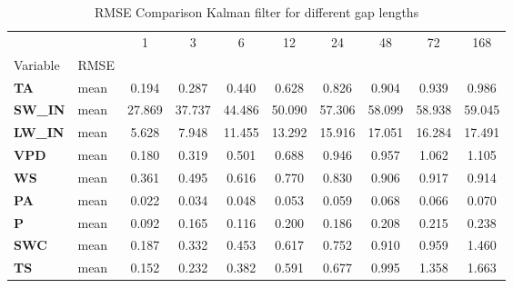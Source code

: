 \begin{table}
\centering
\caption{RMSE Comparison Kalman filter for different gap lengths}
\label{gap_len}
\begin{tabular}{p{2.1cm}l|cccccccc}
\toprule
 &  & 1 & 3 & 6 & 12 & 24 & 48 & 72 & 168 \\
Variable & RMSE &  &  &  &  &  &  &  &  \\
\midrule
\parbox{2.1cm}{\textbf{TA}} & mean & 0.194 & 0.287 & 0.440 & 0.628 & 0.826 & 0.904 & 0.939 & 0.986 \\
\parbox{2.1cm}{\textbf{SW\_IN}} & mean & 27.869 & 37.737 & 44.486 & 50.090 & 57.306 & 58.099 & 58.938 & 59.045 \\
\parbox{2.1cm}{\textbf{LW\_IN}} & mean & 5.628 & 7.948 & 11.455 & 13.292 & 15.916 & 17.051 & 16.284 & 17.491 \\
\parbox{2.1cm}{\textbf{VPD}} & mean & 0.180 & 0.319 & 0.501 & 0.688 & 0.946 & 0.957 & 1.062 & 1.105 \\
\parbox{2.1cm}{\textbf{WS}} & mean & 0.361 & 0.495 & 0.616 & 0.770 & 0.830 & 0.906 & 0.917 & 0.914 \\
\parbox{2.1cm}{\textbf{PA}} & mean & 0.022 & 0.034 & 0.048 & 0.053 & 0.059 & 0.068 & 0.066 & 0.070 \\
\parbox{2.1cm}{\textbf{P}} & mean & 0.092 & 0.165 & 0.116 & 0.200 & 0.186 & 0.208 & 0.215 & 0.238 \\
\parbox{2.1cm}{\textbf{SWC}} & mean & 0.187 & 0.332 & 0.453 & 0.617 & 0.752 & 0.910 & 0.959 & 1.460 \\
\parbox{2.1cm}{\textbf{TS}} & mean & 0.152 & 0.232 & 0.382 & 0.591 & 0.677 & 0.995 & 1.358 & 1.663 \\
\bottomrule
\end{tabular}
\end{table}
